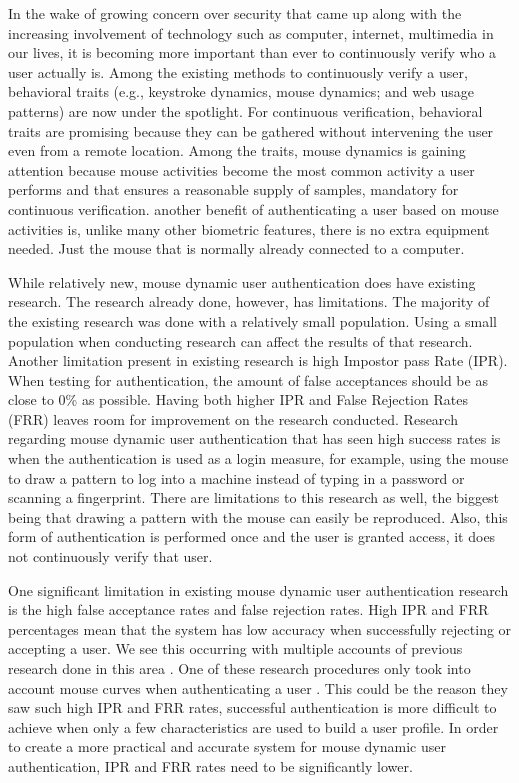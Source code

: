 \documentclass[conference]{IEEEtran}
\begin{document}
In the wake of growing concern over security that came up along with the increasing involvement of technology such as computer, internet, multimedia in our lives, it is becoming more important than ever to continuously verify who a user actually is. Among the existing methods to continuously verify a user, behavioral traits (e.g., keystroke dynamics,  mouse dynamics; and web usage patterns) are now under the spotlight. For continuous verification, behavioral traits are promising because they can be gathered without intervening the user even from a remote location. Among the traits, mouse dynamics is gaining attention because mouse activities become the most common activity a user performs and that ensures a reasonable supply of samples, mandatory for continuous verification. another benefit of authenticating a user based on mouse activities is, unlike many other biometric features, there is no extra equipment needed. Just the mouse that is normally already connected to a computer.

While relatively new, mouse dynamic user authentication does have existing research. The research already done, however, has limitations. The majority of the existing research was done with a relatively small population. Using a small population when conducting research can affect the results of that research. Another limitation present in existing research is high Impostor pass Rate (IPR). When testing for authentication, the amount of false acceptances should be as close to 0\% as possible. Having both higher IPR and False Rejection Rates (FRR) leaves room for improvement on the research conducted. Research regarding mouse dynamic user authentication that has seen high success rates is when the authentication is used as a login measure, for example, using the mouse to draw a pattern to log into a machine instead of typing in a password or scanning a fingerprint. There are limitations to this research as well, the biggest being that drawing a pattern with the mouse can easily be reproduced. Also, this form of authentication is performed once and the user is granted access, it does not continuously verify that user.

One significant limitation in existing mouse dynamic user authentication research is the high false acceptance rates and false rejection rates. High IPR and FRR percentages mean that the system has low accuracy when successfully rejecting or accepting a user. We see this occurring with multiple accounts of previous research done in this area \cite{Jor, CS, Sch}. One of these research procedures only took into account mouse curves when authenticating a user \cite{Sch}. This could be the reason they saw such high IPR and FRR rates, successful authentication is more difficult to achieve when only a few characteristics are used to build a user profile. In order to create a more practical and accurate system for mouse dynamic user authentication, IPR and FRR rates need to be significantly lower.
\end{document}
